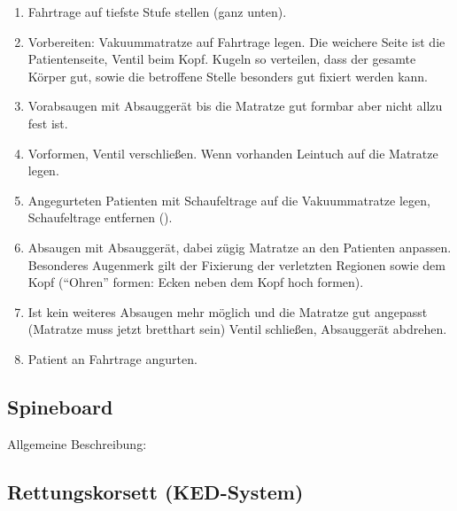 \begin{enumerate}
    \item Fahrtrage auf tiefste Stufe stellen (ganz unten).
    \item Vorbereiten: Vakuummatratze auf Fahrtrage legen. Die weichere
    Seite ist die Patientenseite, Ventil beim Kopf. Kugeln so verteilen,
    dass der gesamte Körper gut, sowie die betroffene Stelle besonders gut
    fixiert werden kann.
    \item Vorabsaugen mit Absauggerät bis die Matratze gut formbar aber nicht allzu
    fest ist.
    \item Vorformen, Ventil verschließen. Wenn vorhanden Leintuch auf
    die Matratze legen.
    \item Angegurteten Patienten mit Schaufeltrage auf die Vakuummatratze
    legen, Schaufeltrage entfernen ().
    \item Absaugen mit Absauggerät, dabei zügig Matratze an den Patienten
    anpassen. Besonderes Augenmerk gilt der Fixierung der verletzten
    Regionen sowie dem Kopf ("`Ohren"'
    formen: Ecken neben dem Kopf hoch formen).
    \item Ist kein weiteres Absaugen mehr möglich und die Matratze gut
    angepasst (Matratze muss jetzt bretthart sein) Ventil schließen,
    Absauggerät abdrehen.
    \item Patient an Fahrtrage angurten.
\end{enumerate}

\subsection{Spineboard}
\label{topic:spineboard-anwendung}

Allgemeine Beschreibung:



\clearpage
\subsection{Rettungskorsett (KED-System)}
\label{topic:rettungskorsett-anwendung}

